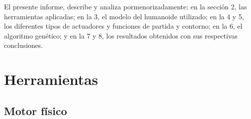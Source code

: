 \documentclass{article}
\begin{document}
El presente informe, describe y analiza pormenorizadamente: en la secci\'on 2, las herramientas aplicadas; en la 3, el modelo del humanoide utilizado; en la 4 y 5, los diferentes tipos de actuadores y funciones de partida y contorno; en la 6, el algoritmo gen\'etico; y en la 7 y 8, los resultados obtenidos con sus respectivas conclusiones.


\newpage


\section{Herramientas}

\subsection{Motor f\'isico}
\end{document}

